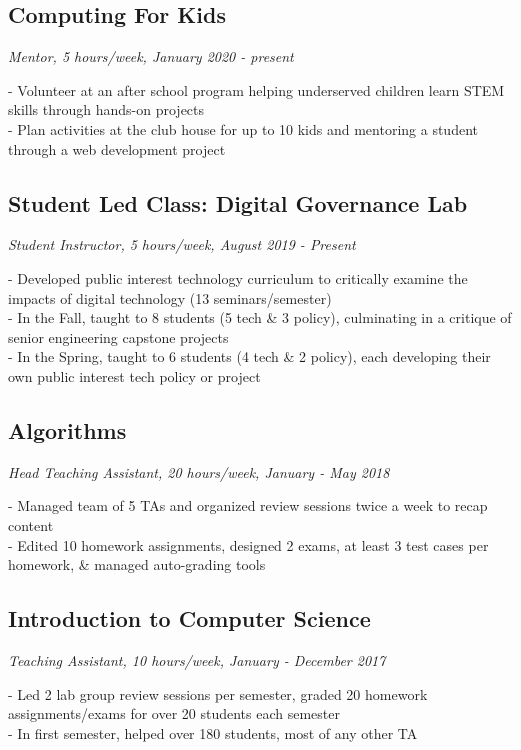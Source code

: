 \documentclass{article}
\begin{document}
\subsection{Computing For Kids} \hfill \textit{Mentor, 5 hours/week, January 2020 - present}

\noindent - Volunteer at an after school program helping underserved children learn STEM skills through hands-on projects\\
- Plan activities at the club house for up to 10 kids and mentoring a student through a web development project

\subsection{Student Led Class: Digital Governance Lab} \hfill \textit{Student Instructor, 5 hours/week, August 2019 - Present}

\noindent - Developed public interest technology curriculum to critically examine the impacts of digital technology (13 seminars/semester) \\
- In the Fall, taught to 8 students (5 tech \& 3 policy), culminating in a critique of senior engineering capstone projects \\
- In the Spring, taught to 6 students (4 tech \& 2 policy), each developing their own public interest tech policy or project

\subsection{Algorithms} \hfill \textit{Head Teaching Assistant, 20 hours/week, January - May 2018}

\noindent - Managed team of 5 TAs and organized review sessions twice a week to recap content \\
- Edited 10 homework assignments, designed 2 exams, at least 3 test cases per homework, \& managed auto-grading tools

\subsection{Introduction to Computer Science} \hfill \textit{Teaching Assistant, 10 hours/week, January - December 2017}

\noindent - Led 2 lab group review sessions per semester, graded 20 homework assignments/exams for over 20 students each semester \\
- In first semester, helped over 180 students, most of any other TA
\end{document}
